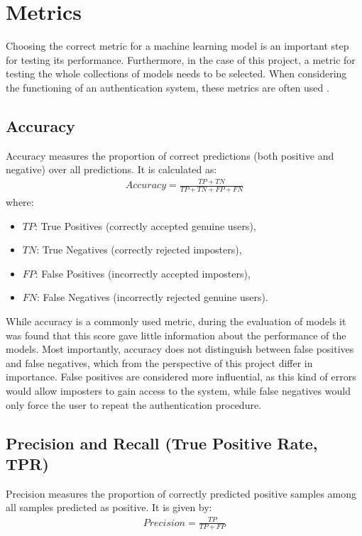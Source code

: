 \section{Metrics}
Choosing the correct metric for a machine learning model is an important step for testing its performance. Furthermore, in the case of this project, a metric for testing the whole collections of models needs to be selected.
When considering the functioning of an authentication system, these metrics are often used \cite{traore2011continuous}. 

\subsection{Accuracy}
Accuracy measures the proportion of correct predictions (both positive and negative) over all predictions. It is calculated as:
\begin{align}
Accuracy = \frac{TP + TN}{TP + TN + FP + FN}
\end{align}
where:
\begin{itemize}
	\item $TP$: True Positives (correctly accepted genuine users),
	\item $TN$: True Negatives (correctly rejected imposters),
	\item $FP$: False Positives (incorrectly accepted imposters),
	\item $FN$: False Negatives (incorrectly rejected genuine users).
\end{itemize}

While accuracy is a commonly used metric, during the evaluation of models it was found that this score gave little information about the performance of the models. Most importantly, accuracy does not distinguish between false positives and false negatives, which from the perspective of this project differ in importance. False positives are considered more influential, as this kind of errors would allow imposters to gain access to the system, while false negatives would only force the user to repeat the authentication procedure.

\subsection{Precision and Recall (True Positive Rate, TPR)}
Precision measures the proportion of correctly predicted positive samples among all samples predicted as positive. It is given by:
\begin{align}
Precision = \frac{TP}{TP + FP}
\end{align}

